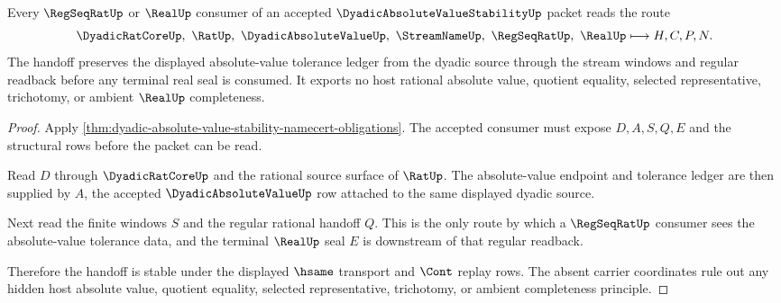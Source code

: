 \begin{theorem}
\label{thm:dyadic-absolute-value-stability-regseqrat-handoff}
Every $\RegSeqRatUp$ or $\RealUp$ consumer of an accepted $\DyadicAbsoluteValueStabilityUp$ packet reads the route
$$
\DyadicRatCoreUp,\ \RatUp,\ \DyadicAbsoluteValueUp,\ \StreamNameUp,\ \RegSeqRatUp,\ \RealUp \longmapsto H,C,P,N .
$$
The handoff preserves the displayed absolute-value tolerance ledger from the dyadic source through the stream windows and regular readback before any terminal real seal is consumed. It exports no host rational absolute value, quotient equality, selected representative, trichotomy, or ambient $\RealUp$ completeness.
\end{theorem}
\begin{proof}
Apply \autoref{thm:dyadic-absolute-value-stability-namecert-obligations}. The accepted consumer must expose $D,A,S,Q,E$ and the structural rows before the packet can be read.

Read $D$ through $\DyadicRatCoreUp$ and the rational source surface of $\RatUp$. The absolute-value endpoint and tolerance ledger are then supplied by $A$, the accepted $\DyadicAbsoluteValueUp$ row attached to the same displayed dyadic source.

Next read the finite windows $S$ and the regular rational handoff $Q$. This is the only route by which a $\RegSeqRatUp$ consumer sees the absolute-value tolerance data, and the terminal $\RealUp$ seal $E$ is downstream of that regular readback.

Therefore the handoff is stable under the displayed $\hsame$ transport and $\Cont$ replay rows. The absent carrier coordinates rule out any hidden host absolute value, quotient equality, selected representative, trichotomy, or ambient completeness principle.
\end{proof}



